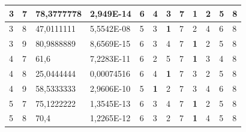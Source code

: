 \documentclass[conference]{IEEEtran}
\begin{document}
\begin{table}[]
\begin{tabular}{|llll|llllllll|}
		\multicolumn{1}{|l|}{3} & \multicolumn{1}{l|}{7} & \multicolumn{1}{l|}{78,3777778} & 2,949E-14 & \multicolumn{1}{l|}{6} & \multicolumn{1}{l|}{4} & \multicolumn{1}{l|}{3} & \multicolumn{1}{l|}{7} & \multicolumn{1}{l|}{\textbf{1}} & \multicolumn{1}{l|}{2} & \multicolumn{1}{l|}{5} & 8 \\ \hline
		\multicolumn{1}{|l|}{3} & \multicolumn{1}{l|}{8} & \multicolumn{1}{l|}{47,0111111} & 5,5542E-08 & \multicolumn{1}{l|}{5} & \multicolumn{1}{l|}{3} & \multicolumn{1}{l|}{\textbf{1}} & \multicolumn{1}{l|}{7} & \multicolumn{1}{l|}{2} & \multicolumn{1}{l|}{4} & \multicolumn{1}{l|}{6} & 8 \\ \hline
		\multicolumn{1}{|l|}{3} & \multicolumn{1}{l|}{9} & \multicolumn{1}{l|}{80,9888889} & 8,6569E-15 & \multicolumn{1}{l|}{6} & \multicolumn{1}{l|}{3} & \multicolumn{1}{l|}{4} & \multicolumn{1}{l|}{7} & \multicolumn{1}{l|}{\textbf{1}} & \multicolumn{1}{l|}{2} & \multicolumn{1}{l|}{5} & 8 \\ \hline
		\multicolumn{1}{|l|}{4} & \multicolumn{1}{l|}{7} & \multicolumn{1}{l|}{61,6} & 7,2283E-11 & \multicolumn{1}{l|}{6} & \multicolumn{1}{l|}{2} & \multicolumn{1}{l|}{5} & \multicolumn{1}{l|}{7} & \multicolumn{1}{l|}{\textbf{1}} & \multicolumn{1}{l|}{3} & \multicolumn{1}{l|}{4} & 8 \\ \hline
		\multicolumn{1}{|l|}{4} & \multicolumn{1}{l|}{8} & \multicolumn{1}{l|}{25,0444444} & 0,00074516 & \multicolumn{1}{l|}{6} & \multicolumn{1}{l|}{4} & \multicolumn{1}{l|}{\textbf{1}} & \multicolumn{1}{l|}{7} & \multicolumn{1}{l|}{3} & \multicolumn{1}{l|}{2} & \multicolumn{1}{l|}{5} & 8 \\ \hline
		\multicolumn{1}{|l|}{4} & \multicolumn{1}{l|}{9} & \multicolumn{1}{l|}{58,5333333} & 2,9606E-10 & \multicolumn{1}{l|}{5} & \multicolumn{1}{l|}{\textbf{1}} & \multicolumn{1}{l|}{2} & \multicolumn{1}{l|}{7} & \multicolumn{1}{l|}{3} & \multicolumn{1}{l|}{4} & \multicolumn{1}{l|}{6} & 8 \\ \hline
		\multicolumn{1}{|l|}{5} & \multicolumn{1}{l|}{7} & \multicolumn{1}{l|}{75,1222222} & 1,3545E-13 & \multicolumn{1}{l|}{6} & \multicolumn{1}{l|}{3} & \multicolumn{1}{l|}{4} & \multicolumn{1}{l|}{7} & \multicolumn{1}{l|}{\textbf{1}} & \multicolumn{1}{l|}{2} & \multicolumn{1}{l|}{5} & 8 \\ \hline
		\multicolumn{1}{|l|}{5} & \multicolumn{1}{l|}{8} & \multicolumn{1}{l|}{70,4} & 1,2265E-12 & \multicolumn{1}{l|}{6} & \multicolumn{1}{l|}{3} & \multicolumn{1}{l|}{2} & \multicolumn{1}{l|}{7} & \multicolumn{1}{l|}{\textbf{1}} & \multicolumn{1}{l|}{4} & \multicolumn{1}{l|}{5} & 8 \\ \hline

\end{tabular}
\end{table}
\end{document}

